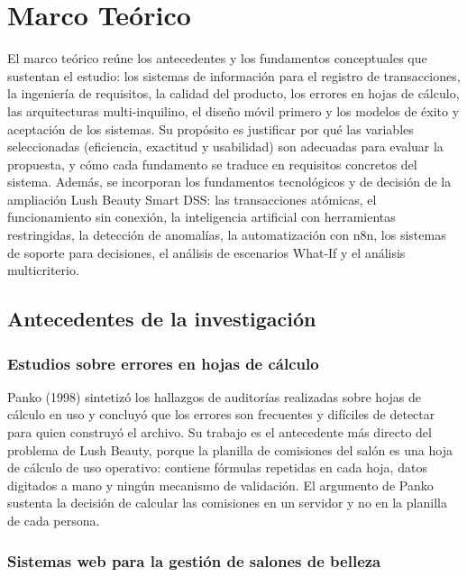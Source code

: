 \section{Marco Teórico}\label{cap:marco}

El marco teórico reúne los antecedentes y los fundamentos conceptuales que sustentan el estudio: los sistemas de información para el registro de transacciones, la ingeniería de requisitos, la calidad del producto, los errores en hojas de cálculo, las arquitecturas multi-inquilino, el diseño móvil primero y los modelos de éxito y aceptación de los sistemas. Su propósito es justificar por qué las variables seleccionadas (eficiencia, exactitud y usabilidad) son adecuadas para evaluar la propuesta, y cómo cada fundamento se traduce en requisitos concretos del sistema. Además, se incorporan los fundamentos tecnológicos y de decisión de la ampliación Lush Beauty Smart DSS: las transacciones atómicas, el funcionamiento sin conexión, la inteligencia artificial con herramientas restringidas, la detección de anomalías, la automatización con n8n, los sistemas de soporte para decisiones, el análisis de escenarios What-If y el análisis multicriterio.

\subsection{Antecedentes de la investigación}

\subsubsection{Estudios sobre errores en hojas de cálculo}

Panko (1998) sintetizó los hallazgos de auditorías realizadas sobre hojas de cálculo en uso y concluyó que los errores son frecuentes y difíciles de detectar para quien construyó el archivo. Su trabajo es el antecedente más directo del problema de Lush Beauty, porque la planilla de comisiones del salón es una hoja de cálculo de uso operativo: contiene fórmulas repetidas en cada hoja, datos digitados a mano y ningún mecanismo de validación. El argumento de Panko sustenta la decisión de calcular las comisiones en un servidor y no en la planilla de cada persona.


\subsubsection{Sistemas web para la gestión de salones de belleza}

